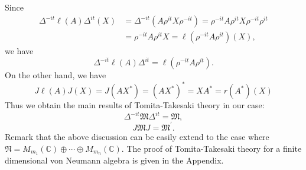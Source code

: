 Since
\begin{equation}
\begin{split}
\Delta^{-it}\ell(A)\Delta^{it}(X)&=\Delta^{-it}(A\rho^{it}X\rho^{-it})=\rho^{-it}A\rho^{it}X\rho^{-it}\rho^{it}\\
                                 &=\rho^{-it}A\rho^{it}X=\ell (\rho^{-it}A\rho^{it})(X),
\end{split}
\end{equation}
we have 
$$
\Delta^{-it}\ell(A)\Delta^{it}=\ell(\rho^{-it}A\rho^{it}).
$$
On the other hand,
we have
$$
J\ell(A)J(X)=J(AX^\ast)=(AX^\ast)^\ast=XA^\ast=r(A^\ast)(X)
$$
Thus we obtain the main results of Tomita-Takesaki theory in our case: 
\begin{equation}\label{TT1}
\Delta^{-it}\mathfrak{M}\Delta^{it}=\mathfrak{M},
\end{equation}
\begin{equation}\label{TT2}
          J\mathfrak{M}J=\mathfrak{M}^{\prime}.
\end{equation}
Remark that the above discussion can be easily extend to the case where 
$\mathfrak{N}=M_{m_1}(\mathbb{C})\oplus \cdots \oplus M_{m_n}(\mathbb{C})$.
The proof of Tomita-Takesaki theory for a finite dimensional von Neumann algebra is given in the Appendix.



